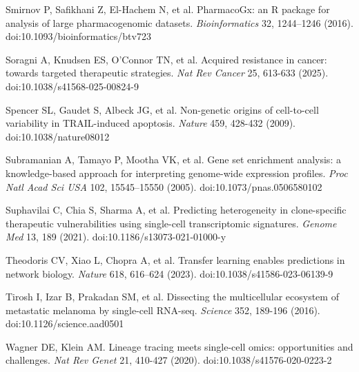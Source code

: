\documentclass[11pt,a4paper]{article}
\begin{document}
\noindent Smirnov P, Safikhani Z, El-Hachem N, et al. PharmacoGx: an R package for analysis of large pharmacogenomic datasets. \emph{Bioinformatics} 32, 1244--1246 (2016). doi:10.1093/bioinformatics/btv723\par\vspace{2pt}

\noindent Soragni A, Knudsen ES, O'Connor TN, et al. Acquired resistance in cancer: towards targeted therapeutic strategies. \emph{Nat Rev Cancer} 25, 613-633 (2025). doi:10.1038/s41568-025-00824-9 \par\vspace{2pt}

\noindent Spencer SL, Gaudet S, Albeck JG, et al. Non-genetic origins of cell-to-cell variability in TRAIL-induced apoptosis. \emph{Nature} 459, 428-432 (2009). doi:10.1038/nature08012 \par\vspace{2pt}

\noindent Subramanian A, Tamayo P, Mootha VK, et al. Gene set enrichment analysis: a knowledge-based approach for interpreting genome-wide expression profiles. \emph{Proc Natl Acad Sci USA} 102, 15545--15550 (2005). doi:10.1073/pnas.0506580102\par\vspace{2pt}

\noindent Suphavilai C, Chia S, Sharma A, et al. Predicting heterogeneity in clone-specific therapeutic vulnerabilities using single-cell transcriptomic signatures. \emph{Genome Med} 13, 189 (2021). doi:10.1186/s13073-021-01000-y \par\vspace{2pt}

\noindent Theodoris CV, Xiao L, Chopra A, et al. Transfer learning enables predictions in network biology. \emph{Nature} 618, 616--624 (2023). doi:10.1038/s41586-023-06139-9\par\vspace{2pt}

\noindent Tirosh I, Izar B, Prakadan SM, et al. Dissecting the multicellular ecosystem of metastatic melanoma by single-cell RNA-seq. \emph{Science} 352, 189-196 (2016). doi:10.1126/science.aad0501 \par\vspace{2pt}

\noindent Wagner DE, Klein AM. Lineage tracing meets single-cell omics: opportunities and challenges. \emph{Nat Rev Genet} 21, 410-427 (2020). doi:10.1038/s41576-020-0223-2 \par\vspace{2pt}
\end{document}
